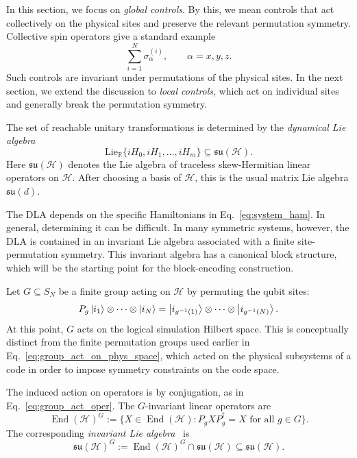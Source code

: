 \documentclass[10pt,twocolumn,superscriptaddress,aps,amsmath,amssymb,citeautoscript,floatfix,prx,longbibliography]{revtex4-2}
\newcounter{alg}
\theoremstyle{plain}
\theoremstyle{plain}
\theoremstyle{plain}
\theoremstyle{plain}
\theoremstyle{plain}
\theoremstyle{plain}
\begin{document}
In this section, we focus on \textit{global controls}. By this, we mean controls that act collectively on the physical sites and preserve the relevant permutation symmetry. Collective spin operators give a standard example
$$
    \sum_{i=1}^N \sigma_\alpha^{(i)},
    \qquad
    \alpha=x,y,z .
$$
Such controls are invariant under permutations of the physical sites. In the next section, we extend the discussion to \textit{local controls}, which act on individual sites and generally break the permutation symmetry.

The set of reachable unitary transformations is determined by the \textit{dynamical Lie algebra}~\cite{DAlessandro2021, Albertini2003}
$$
    \mathrm{Lie}_{\mathbb R}
    \{iH_0,iH_1,\ldots,iH_m\}
    \subseteq
    \mathfrak{su}(\mathcal H).
$$
Here $\mathfrak{su}(\mathcal H)$ denotes the Lie algebra of traceless skew-Hermitian linear operators on $\mathcal H$. After choosing a basis of $\mathcal H$, this is the usual matrix Lie algebra $\mathfrak{su}(d)$.

The DLA depends on the specific Hamiltonians in Eq.~\eqref{eq:system_ham}. In general, determining it can be difficult. In many symmetric systems, however, the DLA is contained in an invariant Lie algebra associated with a finite site-permutation symmetry. This invariant algebra has a canonical block structure, which will be the starting point for the block-encoding construction.

Let $G\subseteq S_N$ be a finite group acting on $\mathcal H$ by permuting the qubit sites:
$$
    P_g
    \ket{i_1}\otimes\cdots\otimes\ket{i_N}
    =
    \ket{i_{g^{-1}(1)}}\otimes\cdots\otimes\ket{i_{g^{-1}(N)}} .
$$
At this point, $G$ acts on the logical simulation Hilbert space. This is conceptually distinct from the finite permutation groups used earlier in Eq.~\eqref{eq:group_act_on_phys_space}, which acted on the physical subsystems of a code in order to impose symmetry constraints on the code space.

The induced action on operators is by conjugation, as in Eq.~\eqref{eq:group_act_oper}. The $G$-invariant linear operators are
$$
    \operatorname{End}(\mathcal H)^G
    :=
    \{
        X\in\operatorname{End}(\mathcal H):
        P_gXP_g^\dagger=X
        \text{ for all } g\in G
    \}.
$$
The corresponding \textit{invariant Lie algebra}~\cite{DAlessandroHartwig2021, Albertini2020} is
$$
    \mathfrak{su}(\mathcal H)^G
    :=
    \operatorname{End}(\mathcal H)^G
    \cap
    \mathfrak{su}(\mathcal H)
    \subseteq
    \mathfrak{su}(\mathcal H).
$$
\end{document}
